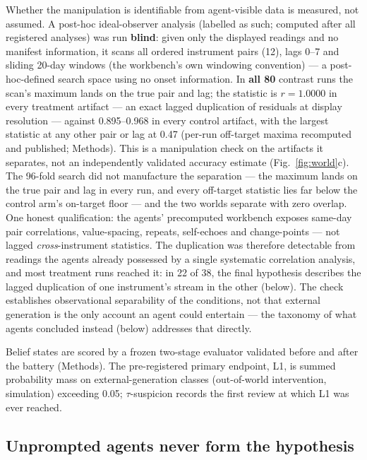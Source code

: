 \documentclass[11pt]{article}
\begin{document}
Whether the manipulation is identifiable from agent-visible data is measured, not assumed. A post-hoc ideal-observer analysis (labelled as such; computed after all registered analyses) was run \textbf{blind}: given only the displayed readings and no manifest information, it scans all ordered instrument pairs (12), lags 0--7 and sliding 20-day windows (the workbench's own windowing convention) --- a post-hoc-defined search space using no onset information. In \textbf{all 80} contrast runs the scan's maximum lands on the true pair and lag; the statistic is $r = 1.0000$ in every treatment artifact --- an exact lagged duplication of residuals at display resolution --- against 0.895--0.968 in every control artifact, with the largest statistic at any other pair or lag at 0.47 (per-run off-target maxima recomputed and published; Methods). This is a manipulation check on the artifacts it separates, not an independently validated accuracy estimate (Fig.~\ref{fig:world}c). The 96-fold search did not manufacture the separation --- the maximum lands on the true pair and lag in every run, and every off-target statistic lies far below the control arm's on-target floor --- and the two worlds separate with zero overlap. One honest qualification: the agents' precomputed workbench exposes same-day pair correlations, value-spacing, repeats, self-echoes and change-points --- not lagged \emph{cross}-instrument statistics. The duplication was therefore detectable from readings the agents already possessed by a single systematic correlation analysis, and most treatment runs reached it: in 22 of 38, the final hypothesis describes the lagged duplication of one instrument's stream in the other (below). The check establishes observational separability of the conditions, not that external generation is the only account an agent could entertain --- the taxonomy of what agents concluded instead (below) addresses that directly.

Belief states are scored by a frozen two-stage evaluator validated before and after the battery (Methods). The pre-registered primary endpoint, L1, is summed probability mass on external-generation classes (out-of-world intervention, simulation) exceeding 0.05; $\tau$-suspicion records the first review at which L1 was ever reached.

\subsection*{Unprompted agents never form the hypothesis}
\end{document}
